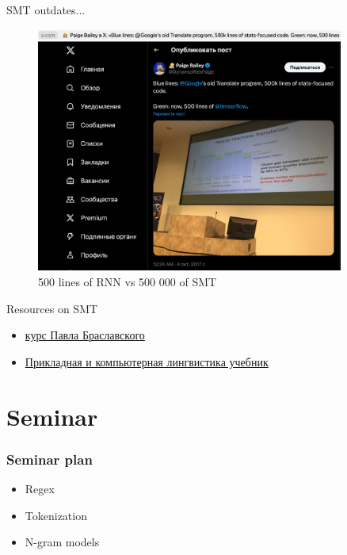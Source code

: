 \documentclass{beamer}
\begin{document}
\begin{frame}{SMT outdates...}
    \begin{figure}
        \centering
        \includegraphics[width=0.9\textwidth,keepaspectratio]{images/500_lines}
        \caption{500 lines of RNN vs 500 000 of SMT}
        \label{fig:500_lines}
    \end{figure}

\end{frame}

\begin{frame}{Resources on SMT}
    \begin{itemize}
        \item \href{https://stepik.org/course/1233/syllabus}{курс Павла Браславского}
        \item \href{https://urss.ru/cgi-bin/db.pl?lang=Ru&blang=ru&page=Book&id=228448}{Прикладная и компьютерная лингвистика учебник}
    \end{itemize}
\end{frame}


\section{Seminar}
\begin{frame}
\frametitle{Seminar plan}
\begin{itemize}
    \item Regex
    \item Tokenization
    \item N-gram models
\end{itemize}
\end{frame}
\end{document}
